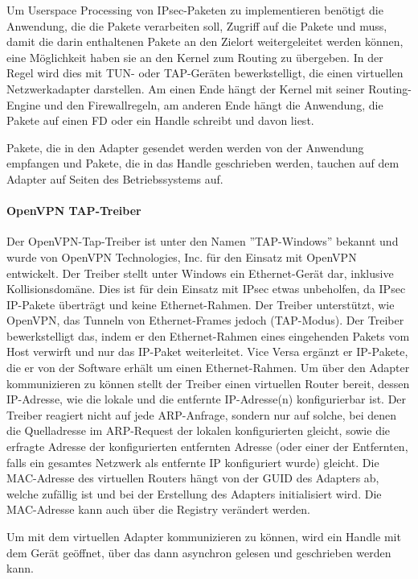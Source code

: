 Um Userspace Processing von \ac{IPsec}-Paketen zu implementieren benötigt
die Anwendung, die die Pakete verarbeiten soll, Zugriff auf die Pakete und muss,
damit die darin enthaltenen Pakete an den Zielort weitergeleitet werden können,
eine Möglichkeit haben sie an den Kernel zum Routing zu übergeben. In der Regel wird
dies mit TUN- oder TAP-Geräten bewerkstelligt, die einen virtuellen Netzwerkadapter
darstellen. Am einen Ende hängt der Kernel mit seiner Routing-Engine und den Firewallregeln,
am anderen Ende hängt die Anwendung, die Pakete auf einen \ac{FD} oder ein Handle schreibt
und davon liest.

Pakete, die in den Adapter gesendet werden werden von der Anwendung empfangen
und Pakete, die in das Handle geschrieben werden, tauchen auf dem Adapter auf Seiten
des Betriebssystems auf.

\paragraph{OpenVPN TAP-Treiber}
Der OpenVPN-Tap-Treiber ist unter den Namen ''TAP-Windows'' bekannt und wurde von
OpenVPN Technologies, Inc. für den Einsatz mit OpenVPN entwickelt.
Der Treiber stellt unter Windows ein Ethernet-Gerät dar, inklusive Kollisionsdomäne.
Dies ist für dein Einsatz mit \ac{IPsec} etwas unbeholfen, da \ac{IPsec} \ac{IP}-Pakete
überträgt und keine Ethernet-Rahmen.
Der Treiber unterstützt, wie OpenVPN, das Tunneln von Ethernet-Frames jedoch (TAP-Modus).
Der Treiber bewerkstelligt das, indem er den Ethernet-Rahmen eines eingehenden Pakets vom
Host verwirft und nur das IP-Paket weiterleitet. Vice Versa ergänzt er IP-Pakete, die er von
der Software erhält um einen Ethernet-Rahmen. Um über den Adapter kommunizieren zu können
stellt der Treiber einen virtuellen Router bereit, dessen \ac{IP}-Adresse, wie die lokale  und
die entfernte IP-Adresse(n) konfigurierbar ist.
Der Treiber reagiert nicht auf jede ARP-Anfrage, sondern nur auf solche, bei denen
die Quelladresse im ARP-Request der lokalen konfigurierten gleicht, sowie die erfragte Adresse
der konfigurierten entfernten Adresse (oder einer der Entfernten, falls ein gesamtes Netzwerk
als entfernte IP konfiguriert wurde) gleicht.
Die MAC-Adresse des virtuellen Routers hängt von der GUID des Adapters ab, welche zufällig ist
und bei der Erstellung des Adapters initialisiert wird. Die MAC-Adresse kann 
auch über die Registry verändert werden.

Um mit dem virtuellen Adapter kommunizieren zu können, wird ein Handle mit dem Gerät
geöffnet, über das dann asynchron gelesen und geschrieben werden kann.

